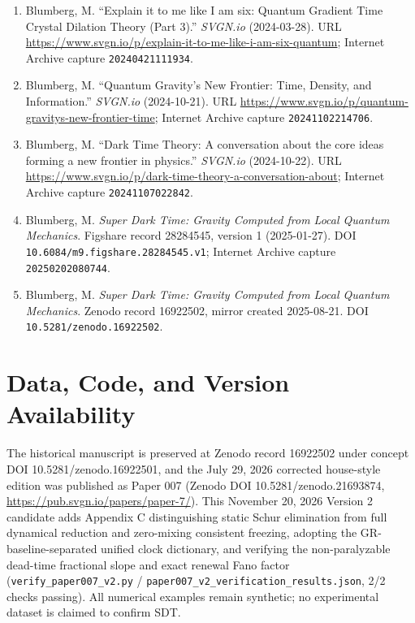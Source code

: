 \documentclass[
  american,
  11pt,
  letterpaper,
]{article}
\begin{document}
\begin{enumerate}
\item
  Blumberg, M. ``Explain it to me like I am six: Quantum Gradient Time Crystal Dilation Theory (Part 3).'' \emph{SVGN.io} (2024-03-28). URL \url{https://www.svgn.io/p/explain-it-to-me-like-i-am-six-quantum}; Internet Archive capture \texttt{20240421111934}.
\item
  Blumberg, M. ``Quantum Gravity's New Frontier: Time, Density, and Information.'' \emph{SVGN.io} (2024-10-21). URL \url{https://www.svgn.io/p/quantum-gravitys-new-frontier-time}; Internet Archive capture \texttt{20241102214706}.
\item
  Blumberg, M. ``Dark Time Theory: A conversation about the core ideas forming a new frontier in physics.'' \emph{SVGN.io} (2024-10-22). URL \url{https://www.svgn.io/p/dark-time-theory-a-conversation-about}; Internet Archive capture \texttt{20241107022842}.
\item
  Blumberg, M. \emph{Super Dark Time: Gravity Computed from Local Quantum Mechanics}. Figshare record 28284545, version 1 (2025-01-27). DOI \nolinkurl{10.6084/m9.figshare.28284545.v1}; Internet Archive capture \texttt{20250202080744}.
\item
  Blumberg, M. \emph{Super Dark Time: Gravity Computed from Local Quantum Mechanics}. Zenodo record 16922502, mirror created 2025-08-21. DOI \nolinkurl{10.5281/zenodo.16922502}.
\end{enumerate}

\section{Data, Code, and Version Availability}\label{data-code-and-version-availability}

The historical manuscript is preserved at Zenodo record 16922502 under concept DOI 10.5281/zenodo.16922501, and the July 29, 2026 corrected house-style edition was published as Paper 007 (Zenodo DOI 10.5281/zenodo.21693874, \url{https://pub.svgn.io/papers/paper-7/}). This November 20, 2026 Version 2 candidate adds Appendix C distinguishing static Schur elimination from full dynamical reduction and zero-mixing consistent freezing, adopting the GR-baseline-separated unified clock dictionary, and verifying the non-paralyzable dead-time fractional slope and exact renewal Fano factor (\nolinkurl{verify_paper007_v2.py} / \nolinkurl{paper007_v2_verification_results.json}, 2/2 checks passing). All numerical examples remain synthetic; no experimental dataset is claimed to confirm SDT.
\end{document}
